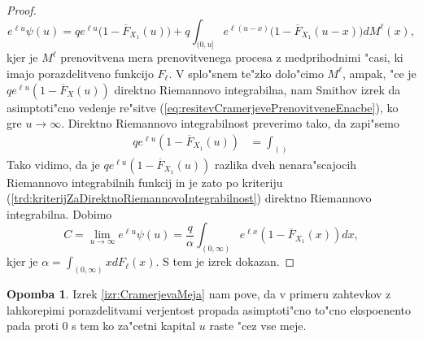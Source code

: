 \documentclass[12pt, a4paper, reqno]{amsart}
\theoremstyle{definition}
\newtheorem{opomba}[definicija]{Opomba}
\theoremstyle{plain}
\newcommand{\1}{\mathds{1}}
\begin{document}
\begin{proof}
                \begin{equation}
                    e^{\ell u}\psi(u) =qe^{\ell u}\bigl(1 - \overline{F}_{X_1}(u)\bigr) +  q\int_{(0, u]}e^{\ell(u - x)}\bigl(1 - \overline{F}_{X_1}(u - x)\bigr)dM^{\ell}(x),
                    \label{eq:resitevCramerjevePrenovitveneEnacbe}
                \end{equation}
                kjer je $M^{\ell}$ prenovitvena mera prenovitvenega procesa z medprihodnimi "casi, 
                ki imajo porazdelitveno funkcijo $F_\ell$. V splo"snem te"zko dolo"cimo $M^{\ell}$, 
                ampak, "ce je $qe^{\ell u}(1 - \overline{F}_X(u))$ direktno Riemannovo integrabilna, nam 
                Smithov izrek da asimptoti"cno vedenje re"sitve (\ref{eq:resitevCramerjevePrenovitveneEnacbe}),
                ko gre $u\to\infty$.
                Direktno Riemannovo integrabilnost preverimo tako, da zapi"semo 
                \begin{align*}
                    qe^{\ell u}(1 - \overline{F}_{X_1}(u)) &= \int_{()}
                \end{align*}
                Tako vidimo, da je $qe^{\ell u}(1 - \overline{F}_{X_1}(u))$ razlika dveh nenara"scajocih
                Riemannovo integrabilnih funkcij in je zato po kriteriju (\ref{trd:kriterijZaDirektnoRiemannovoIntegrabilnost}) 
                direktno Riemannovo integrabilna. Dobimo 
                \begin{equation}
                    C = \lim_{u\to\infty}e^{\ell u}\psi(u) =  \frac{q}{\alpha} \int_{(0, \infty)}e^{\ell x}(1 - \overline{F}_{X_1}(x))dx,
                    \label{eq:CramerBoundConstant}
                \end{equation}
                kjer je $\alpha = \int_{(0, \infty)}x dF_\ell(x)$. S tem je izrek dokazan.
            \end{proof}

            \begin{opomba}
                Izrek \ref{izr:CramerjevaMeja} nam pove, da v primeru zahtevkov z lahkorepimi porazdelitvami verjentost
                propada asimptoti"cno to"cno ekspoenento pada proti $0$ s tem ko za"cetni kapital $u$ raste 
                "cez vse meje.
                
                \label{op:pomenCramerevegaIzreka}
            \end{opomba}
\end{document}

